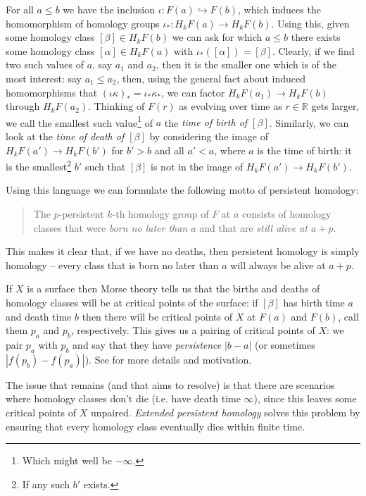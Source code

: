 \documentclass[12pt]{article}
\numberwithin{equation}{subsection}
\numberwithin{theorem}{subsection}
\numberwithin{lemma}{subsection}
\numberwithin{corollary}{subsection}
\numberwithin{definition}{subsection}
\numberwithin{example}{subsection}
\numberwithin{note}{subsection}
\newcommand{\rr}{\mathbb{R}}
\begin{document}
        \bigskip

        For all $a\leqslant b$ we have the inclusion $\iota\colon F(a)\hookrightarrow F(b)$, which induces the homomorphism of homology groups $\iota_*\colon H_kF(a)\to H_kF(b)$.
        Using this, given some homology class $[\beta]\in H_kF(b)$ we can ask for which $a\leqslant b$ there exists some homology class $[\alpha]\in H_kF(a)$ with $\iota_*([\alpha])=[\beta]$.
        Clearly, if we find two such values of $a$, say $a_1$ and $a_2$, then it is the smaller one which is of the most interest: say $a_1\leqslant a_2$, then, using the general fact about induced homomorphisms that $(\iota\kappa)_*=\iota_*\kappa_*$, we can factor $H_kF(a_1)\to H_kF(b)$ through $H_kF(a_2)$.
        Thinking of $F(r)$ as evolving over time as $r\in\rr$ gets larger, we call the smallest such value\footnote{
            Which might well be $-\infty$.
        } of $a$ the \emph{time of birth of $[\beta]$}.
        Similarly, we can look at the \emph{time of death of $[\beta]$} by considering the image of $H_kF(a')\to H_kF(b')$ for $b'>b$ and all $a'<a$, where $a$ is the time of birth: it is the smallest\footnote{
            If any such $b'$ exists.
        } $b'$ such that $[\beta]$ is not in the image of $H_kF(a')\to H_kF(b')$.

        Using this language we can formulate the following motto of persistent homology:
        \begin{quotation}
            The $p$-persistent $k$-th homology group of $F$ at $a$ consists of homology classes that were \emph{born no later than $a$} and that are \emph{still alive at $a+p$}.
        \end{quotation}
        This makes it clear that, if we have no deaths, then persistent homology is simply homology -- every class that is born no later than $a$ will always be alive at $a+p$.

        \bigskip

        If $X$ is a surface then Morse theory tells us that the births and deaths of homology classes will be at critical points of the surface: if $[\beta]$ has birth time $a$ and death time $b$ then there will be critical points of $X$ at $F(a)$ and $F(b)$, call them $p_a$ and $p_b$, respectively.
        This gives us a pairing of critical points of $X$: we pair $p_a$ with $p_b$ and say that they have \emph{persistence} $|b-a|$ (or sometimes $|f(p_b)-f(p_a)|$).
        See \cite[\S2]{CohenSteiner:2009ho} for more details and motivation.

        The issue that remains (and that \cite{CohenSteiner:2009ho} aims to resolve) is that there are scenarios where homology classes don't die (i.e. have death time $\infty$), since this leaves some critical points of $X$ unpaired.
        \emph{Extended persistent homology} solves this problem by ensuring that every homology class eventually dies within finite time.
\end{document}

